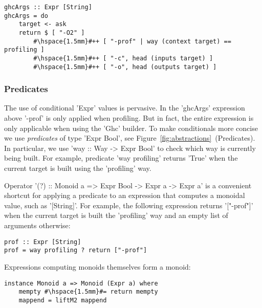 \begin{lstlisting}
ghcArgs :: Expr [String]
ghcArgs = do
    target <- ask
    return $ [ "-O2" ]
        #\hspace{1.5mm}#++ [ "-prof" | way (context target) == profiling ]
        #\hspace{1.5mm}#++ [ "-c", head (inputs target) ]
        #\hspace{1.5mm}#++ [ "-o", head (outputs target) ]
\end{lstlisting}

\subsubsection{Predicates}

The use of conditional \lst'Expr' values is pervasive. In the \lst'ghcArgs' expression
above \lst'-prof' is only applied when profiling. But in fact, the entire expression
is only applicable when using the \lst'Ghc' builder. To make conditionals more concise
we use \emph{predicates} of type \lst'Expr Bool', see
Figure~\ref{fig:abstractions}~(Predicates). In particular, we
use \lst'way :: Way -> Expr Bool' to check which way is currently being built.
For example, predicate \lst'way profiling' returns \lst'True' when the
current target is built using the \lst'profiling' way.

Operator \lst'(?) :: Monoid a => Expr Bool -> Expr a -> Expr a' is a
convenient shortcut for applying a predicate to an expression that computes a monoidal value, such
as \lst'[String]'. For example, the following expression returns
\lst'["-prof"]' when the current target is built the \lst'profiling' way and an
empty list of arguments otherwise:

\begin{lstlisting}
prof :: Expr [String]
prof = way profiling ? return ["-prof"]
\end{lstlisting}

\noindent Expressions computing monoids themselves form a monoid:

\begin{lstlisting}
instance Monoid a => Monoid (Expr a) where
    mempty #\hspace{1.5mm}#= return mempty
    mappend = liftM2 mappend
\end{lstlisting}

